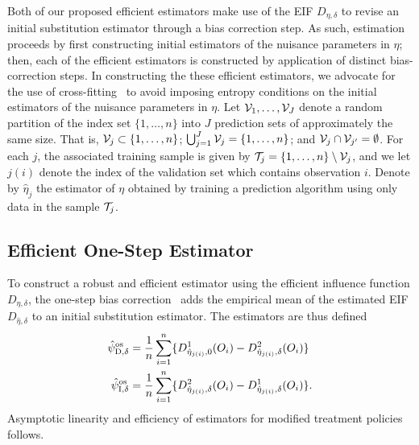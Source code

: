Both of our proposed efficient estimators make use of the EIF $D_{\eta, \delta}$
to revise an initial substitution estimator through a bias correction step. As
such, estimation proceeds by first constructing initial estimators of the
nuisance parameters in $\eta$; then, each of the efficient estimators is
constructed by application of distinct bias-correction steps. In constructing
the these efficient estimators, we advocate for the use of
cross-fitting~\citep{klaassen1987consistent, zheng2011cross,
chernozhukov2018double} to avoid imposing entropy conditions on the initial
estimators of the nuisance parameters in $\eta$. Let ${\cal V}_1, \ldots, {\cal
V}_J$ denote a random partition of the index set $\{1, \ldots, n\}$ into $J$
prediction sets of approximately the same size. That is, ${\cal V}_j\subset
\{1, \ldots, n\}$; $\bigcup_{j=1}^J {\cal V}_j = \{1, \ldots, n\}$; and ${\cal
V}_j\cap {\cal V}_{j'} = \emptyset$. For each $j$, the associated training
sample is given by ${\cal T}_j = \{1, \ldots, n\} \setminus {\cal V}_j$, and we
let $j(i)$ denote the index of the validation set which contains observation
$i$. Denote by $\hat \eta_{j}$ the estimator of $\eta$ obtained by training a
prediction algorithm using only data in the sample ${\cal T}_j$.

\subsection{Efficient One-Step Estimator}

To construct a robust and efficient estimator using the efficient influence
function $D_{\eta, \delta}$, the one-step bias
correction~\citep{pfanzagl1985contributions, bickel1993efficient} adds the
empirical mean of the estimated EIF $D_{\hat{\eta}, \delta}$ to an initial
substitution estimator. The estimators are thus defined
\begin{equation}\label{eq:aipw}
  \begin{split}
    \hat\psi_{\mbox{\scriptsize D}, \delta}^{\mbox{\scriptsize os}} &= \frac{1}{n} \sum_{i = 1}^n \{D^1_{\hat\eta_{j(i)},
      0}(O_i) - D^2_{\hat\eta_{j(i)}, \delta}(O_i)\}\\
    \hat\psi_{\mbox{\scriptsize I}, \delta}^{\mbox{\scriptsize os}} &= \frac{1}{n} \sum_{i = 1}^n \{D^2_{\hat\eta_{j(i)},
      \delta}(O_i) - D^1_{\hat\eta_{j(i)}, \delta}(O_i)\}.
  \end{split}
\end{equation}
Asymptotic linearity and efficiency of estimators for modified treatment
policies follows.

